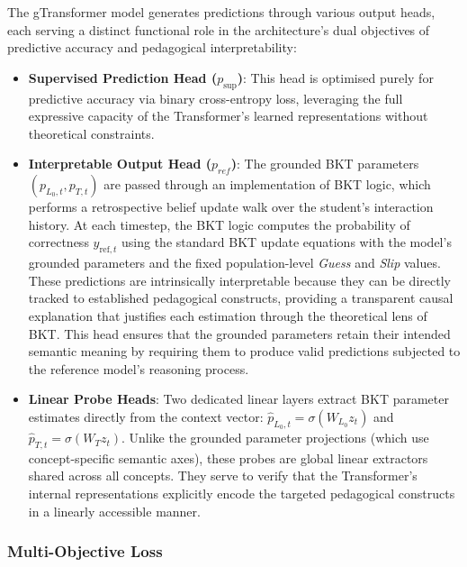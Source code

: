 \documentclass[applsci,article,submit,moreauthors,pdftex]{Definitions/mdpi}
\begin{document}
The gTransformer model generates predictions through various output heads, each serving a distinct functional role in the architecture's dual objectives of predictive accuracy and pedagogical interpretability:
\begin{itemize}
    \item \textbf{Supervised Prediction Head ($p_{\text{sup}}$)}:  This head is optimised purely for predictive accuracy via binary cross-entropy loss, leveraging the full expressive capacity of the Transformer's learned representations without theoretical constraints.
    \item \textbf{Interpretable Output Head ($p_{ref}$)}: The grounded BKT parameters $(p_{L_0,t}, p_{T,t})$ are passed through an implementation of BKT logic, which performs a retrospective belief update walk over the student's interaction history. At each timestep, the BKT logic computes the probability of correctness $\hat{y}_{\text{ref},t}$ using the standard BKT update equations with the model's grounded parameters and the fixed population-level \textit{Guess} and \textit{Slip} values. These predictions are intrinsically interpretable because they can be directly tracked to established pedagogical constructs, providing a transparent causal explanation that justifies each estimation through the theoretical lens of BKT. This head ensures that the grounded parameters retain their intended semantic meaning by requiring them to produce valid predictions subjected to the reference model's reasoning process.
    \item \textbf{Linear Probe Heads}: Two dedicated linear layers extract BKT parameter estimates directly from the context vector: $\hat{p}_{L_0,t} = \sigma(W_{L_0} z_t)$ and $\hat{p}_{T,t} = \sigma(W_{T} z_t)$. Unlike the grounded parameter projections (which use concept-specific semantic axes), these probes are global linear extractors shared across all concepts. They serve to verify that the Transformer's internal representations explicitly encode the targeted pedagogical constructs in a linearly accessible manner.
\end{itemize}

\subsubsection{Multi-Objective Loss} \label{sec_loss}
\end{document}
